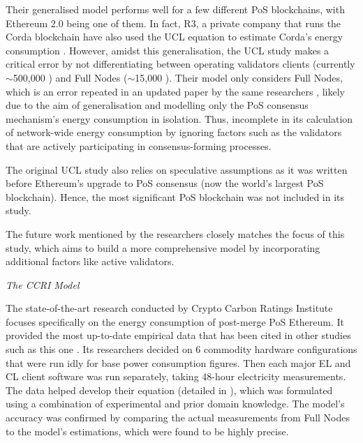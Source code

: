 Their generalised model performs well for a few different PoS blockchains, with Ethereum 2.0 being one of them. In fact, R3, a private company that runs the Corda blockchain have also used the UCL  equation to estimate Corda's energy consumption \cite{JustBlog}. However, amidst this generalisation, the UCL study makes a critical error by not differentiating between operating validators clients (currently $\sim$500,000 \cite{EthereumEthereum.orgc}) and Full Nodes ($\sim$15,000 \cite{NodewatchAnalytics}). Their model only considers Full Nodes, which is an error repeated in an updated paper by the same researchers \cite{IbanezTheExpansion}, likely due to the aim of generalisation and modelling only the PoS consensus mechanism's energy consumption in isolation. Thus, incomplete in its calculation of network-wide energy consumption by ignoring factors such as the validators that are actively participating in consensus-forming processes. 

The original UCL study also relies on speculative assumptions as it was written before Ethereum’s upgrade to PoS consensus (now the world’s largest PoS blockchain). Hence, the most significant PoS blockchain was not included in its study.

The future work mentioned by the researchers closely matches the focus of this study, which aims to build a more comprehensive model by incorporating additional factors like active validators.


\textit{The CCRI Model } 
\label{CCRIModelLitRev}

The state-of-the-art research conducted by Crypto Carbon Ratings Institute focuses specifically on the energy consumption of post-merge PoS Ethereum. It provided the most up-to-date empirical data that has been cited in other studies such as this one \cite{CryptoCarbonRatingsInstitute2022TheNetwork}. Its researchers decided on 6 commodity hardware configurations that were run idly for base power consumption figures. Then each major EL and CL client software was run separately, taking 48-hour electricity measurements. The data helped develop their equation (detailed in ), which was formulated using a combination of experimental and prior domain knowledge. The model's accuracy was confirmed by comparing the actual measurements from Full Nodes to the model's estimations, which were found to be highly precise.


